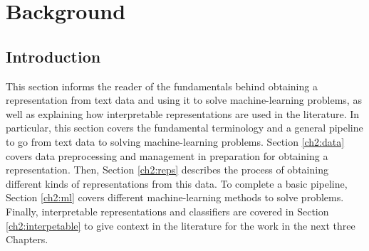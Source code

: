 \chapter{Background}




\section{Introduction}


This section informs the reader of the fundamentals behind obtaining a representation from text data and using it to solve machine-learning problems, as well as explaining how interpretable representations are used in the literature. In particular, this section covers the fundamental terminology and a general pipeline to go from text data to solving machine-learning problems. Section \ref{ch2:data} covers data preprocessing and management in preparation for obtaining a representation. Then, Section \ref{ch2:reps} describes the process of obtaining different kinds of representations from this data. To complete a basic pipeline, Section \ref{ch2:ml} covers different machine-learning methods to solve problems. Finally, interpretable representations and classifiers are covered in Section \ref{ch2:interpetable} to give context in the literature for the work in the next three Chapters. 




